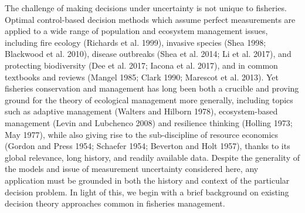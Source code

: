 \documentclass[3p]{elsarticle} %
\begin{document}
The challenge of making decisions under uncertainty is not unique to
fisheries. Optimal control-based decision methods which assume perfect
measurements are applied to a wide range of population and ecosystem
management issues, including fire ecology (Richards et al. 1999),
invasive species (Shea 1998; Blackwood et al. 2010), disease outbreaks
(Shea et al. 2014; Li et al. 2017), and protecting biodiversity (Dee et
al. 2017; Iacona et al. 2017), and in common textbooks and reviews
(Mangel 1985; Clark 1990; Marescot et al. 2013). Yet fisheries
conservation and management has long been both a crucible and proving
ground for the theory of ecological management more generally, including
topics such as adaptive management (Walters and Hilborn 1978),
ecosystem-based management (Levin and Lubchenco 2008) and resilience
thinking (Holling 1973; May 1977), while also giving rise to the
sub-discipline of resource economics (Gordon and Press 1954; Schaefer
1954; Beverton and Holt 1957), thanks to its global relevance, long
history, and readily available data. Despite the generality of the
models and issue of measurement uncertainty considered here, any
application must be grounded in both the history and context of the
particular decision problem. In light of this, we begin with a brief
background on existing decision theory approaches common in fisheries
management.
\end{document}
